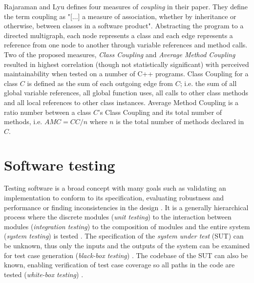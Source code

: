 Rajaraman and Lyu \cite{rajaraman1992reliability} defines four measures of
\textit{coupling} in their paper. They define the term coupling as "[...] a
measure of association, whether by inheritance or otherwise, between classes in
a software product". Abstracting the program to a directed multigraph, each
node represents a class and each edge represents a reference from one node to
another through variable references and method calls. Two of the proposed
measures, \textit{Class Coupling} and \textit{Average Method Coupling} resulted
in highest correlation (though not statistically significant) with perceived
maintainability when tested on a number of C++ programs. Class Coupling for a
class $C$ is defined as the sum of each outgoing edge from $C$; i.e. the sum of
all global variable references, all global function uses, all calls to other
class methods and all local references to other class instances. Average Method
Coupling is a ratio number between a class $C$'s Class Coupling and its total
number of methods, i.e. $AMC = CC / n$ where $n$ is the total number of methods
declared in $C$.

\section{Software testing}


Testing software is a broad concept with many goals such as validating an
implementation to conform to its specification, evaluating robustness and
performance or finding inconsistencies in the design
\cite{bertolino2007software}. It is a generally hierarchical process where the
discrete modules (\textit{unit testing}) to the interaction between modules
(\textit{integration testing}) to the composition of modules and the entire
system (\textit{system testing}) is tested \cite{raymond1998automatic}. The
specification of the \textit{system under test} (SUT) can be unknown, thus only
the inputs and the outputs of the system can be examined for test case
generation (\textit{black-box testing}) \cite{jorgensen2016software}. The
codebase of the SUT can also be known, enabling verification of test case
coverage so all paths in the code are tested (\textit{white-box testing})
\cite{jorgensen2016software}.

